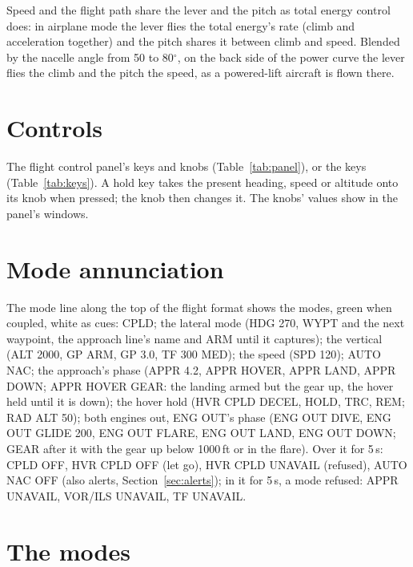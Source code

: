 \documentclass[11pt,a4paper,oneside]{book}
\newcommand{\Tab}[1]{}
\newcommand{\ann}[1]{\textsf{#1}}
\begin{document}
Speed and the flight path share the lever and the pitch as total energy control does: in airplane mode the lever
flies the total energy's rate (climb and acceleration together) and the pitch shares it between climb and speed.
Blended by the nacelle angle from 50 to 80$^\circ$, on the back side of the power curve the lever flies the climb and
the pitch the speed, as a powered-lift aircraft is flown there.

\section{Controls}
The flight control panel's keys and knobs (Table~\ref{tab:panel}), or the keys (Table~\ref{tab:keys}). A hold key takes
the present heading, speed or altitude onto its knob when pressed; the knob then changes it. The knobs' values show in
the panel's windows.
\begin{table}[H]
\centering\small
\caption{The flight control panel.}\label{tab:panel}
\Tab{panel}
\end{table}

\section{Mode annunciation}\label{sec:annunciation}
The mode line along the top of the flight format shows the modes, green when coupled, white as cues: \ann{CPLD}; the
lateral mode (\ann{HDG 270}, \ann{WYPT} and the next waypoint, the approach line's name and \ann{ARM} until it captures);
the vertical (\ann{ALT 2000}, \ann{GP ARM}, \ann{GP 3.0}, \ann{TF 300 MED}); the speed (\ann{SPD 120}); \ann{AUTO NAC};
the approach's phase (\ann{APPR 4.2}, \ann{APPR HOVER}, \ann{APPR LAND}, \ann{APPR DOWN}; \ann{APPR HOVER GEAR}: the
landing armed but the gear up, the hover held until it is down); the hover hold
(\ann{HVR CPLD DECEL}, \ann{HOLD}, \ann{TRC}, \ann{REM}; \ann{RAD ALT 50}); both engines out, ENG OUT's phase
(\ann{ENG OUT DIVE}, \ann{ENG OUT GLIDE 200}, \ann{ENG OUT FLARE}, \ann{ENG OUT LAND}, \ann{ENG OUT DOWN};
\ann{GEAR} after it with the gear up below
1000\,ft or in the flare). Over it for 5\,s: \ann{CPLD OFF},
\ann{HVR CPLD OFF} (let go), \ann{HVR CPLD UNAVAIL} (refused), \ann{AUTO NAC OFF} (also alerts,
Section~\ref{sec:alerts}); in it for 5\,s, a mode refused: \ann{APPR UNAVAIL}, \ann{VOR/ILS UNAVAIL}, \ann{TF UNAVAIL}.

\section{The modes}
\end{document}
